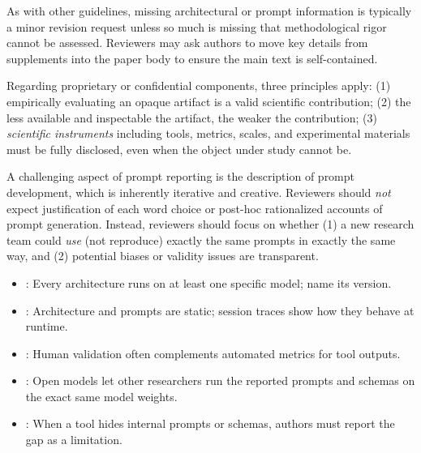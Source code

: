 
As with other guidelines, missing architectural or prompt information is typically a minor revision request unless so much is missing that methodological rigor cannot be assessed. Reviewers may ask authors to move key details from supplements into the paper body to ensure the main text is self-contained.

Regarding proprietary or confidential components, three principles apply: (1) empirically evaluating an opaque artifact is a valid scientific contribution; (2) the less available and inspectable the artifact, the weaker the contribution; (3) \textit{scientific instruments} including tools, metrics, scales, and experimental materials must be fully disclosed, even when the object under study cannot be.

A challenging aspect of prompt reporting is the description of prompt development, which is inherently iterative and creative. Reviewers should \textit{not} expect justification of each word choice or post-hoc rationalized accounts of prompt generation. Instead, reviewers should focus on whether (1) a new research team could \textit{use} (not reproduce) exactly the same prompts in exactly the same way, and (2) potential biases or validity issues are transparent.

\begin{itemize}[label=$\rightarrow$]
    \item \seemodelversion: Every architecture runs on at least one specific model; name its version.
    \item \seetraces: Architecture and prompts are static; session traces show how they behave at runtime.
    \item \seehumanvalidation: Human validation often complements automated metrics for tool outputs.
    \item \seeopenllm: Open models let other researchers run the reported prompts and schemas on the exact same model weights.
    \item \seelimitationsmitigations: When a tool hides internal prompts or schemas, authors must report the gap as a limitation.
\end{itemize}
